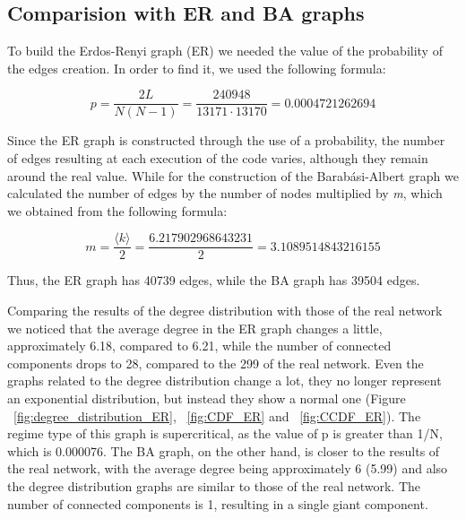 \documentclass[sigchi]{acmart}
\begin{document}
\subsection{Comparision with ER and BA graphs}
To build the Erdos-Renyi graph (ER) we needed the value of the probability of the edges creation. In order to find it, we used the following formula:

\[
p = \frac{2L}{N(N-1)} = \frac{240948}{13171 \cdot 13170} = 0.0004721262694
\]

Since the ER graph is constructed through the use of a probability, the number of edges resulting at each execution of the code varies, although they remain around the real value.
While for the construction of the Barabási-Albert graph we calculated the number of edges by the number of nodes multiplied by \textit{m}, which we obtained from the following formula:

\[
m = \frac{\langle k \rangle}{2} = \frac{6.217902968643231}{2} = 3.1089514843216155
\]

Thus, the ER graph has 40739 edges, while the BA graph has 39504 edges.

Comparing the results of the degree distribution with those of the real network we noticed that the average degree in the ER graph changes a little, approximately 6.18, compared to 6.21, while the number of connected components drops to 28, compared to the 299 of the real network. Even the graphs related to the degree distribution change a lot, they no longer represent an exponential distribution, but instead they show a normal one (Figure ~\ref{fig:degree_distribution_ER}, ~\ref{fig:CDF_ER} and ~\ref{fig:CCDF_ER}). The regime type of this graph is supercritical, as the value of p is greater than 1/N, which is 0.000076. The BA graph, on the other hand, is closer to the results of the real network, with the average degree being approximately 6 (5.99) and also the degree distribution graphs are similar to those of the real network. The number of connected components is 1, resulting in a single giant component.
\end{document}
